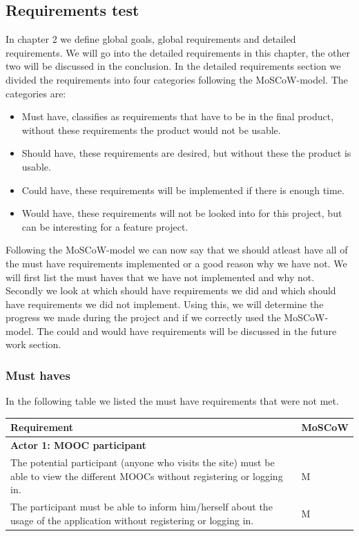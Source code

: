 \subsection{Requirements test}
In chapter 2 we define global goals, global requirements and detailed requirements.
We will go into the detailed requirements in this chapter, the other two will be discussed in the conclusion.
In the detailed requirements section we divided the requirements into four categories following the MoSCoW-model.
The categories are:
\begin{itemize}
\item Must have, classifies as requirements that have to be in the final product, without these requirements the product would not be usable.
\item Should have, these requirements are desired, but without these the product is usable.
\item Could have, these requirements will be implemented if there is enough time.
\item Would have, these requirements will not be looked into for this project, but can be interesting for a feature project.
\end{itemize}

Following the MoSCoW-model we can now say that we should atleast have all of the must have requirements implemented or a good reason why we have not.
We will first list the must haves that we have not implemented and why not.
Secondly we look at which should have requirements we did and which should have requirements we did not implement.
Using this, we will determine the progress we made during the project and if we correctly used the MoSCoW-model.
The could and would have requirements will be discussed in the future work section.

\subsubsection{Must haves}
In the following table we listed the must have requirements that were not met.

\begin{tabular}{ | p{12cm} | p{2cm} | }
\hline
\textbf{Requirement} & \textbf{MoSCoW} \\ \hline
\multicolumn{3}{|p{14.5cm}|}{\textbf{Actor 1: MOOC participant}} \\ \hline
The potential participant (anyone who visits the site) must be able to view the different MOOCs without registering or logging in. & M \\ \hline
The participant must be able to inform him/herself about the usage of the application without registering or logging in. & M \\ \hline
\end{tabular}

